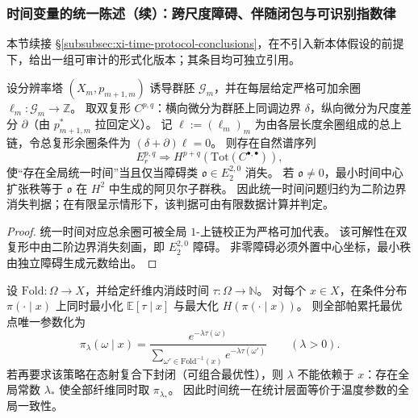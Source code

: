 \subsubsection{时间变量的统一陈述（续）：跨尺度障碍、伴随闭包与可识别指数律}\label{subsubsec:xi-time-protocol-conclusions-part2}
本节续接 \S\ref{subsubsec:xi-time-protocol-conclusions}，在不引入新本体假设的前提下，给出一组可审计的形式化版本；其条目均可独立引用。

\begin{theorem}\label{thm:xi-scale-time-bicomplex-obstruction}
设分辨率塔 \((X_m,p_{m+1,m})\) 诱导群胚 \(\mathcal G_m\)，并在每层给定严格可加余圈 \(\ell_m:\mathcal G_m\to\mathbb Z\)。
取双复形 \(C^{p,q}\)：横向微分为群胚上同调边界 \(\delta\)，纵向微分为尺度差分 \(\partial\)（由 \(p_{m+1,m}^\ast\) 拉回定义）。
记 \(\ell:=(\ell_m)_m\) 为由各层长度余圈组成的总上链，令总复形余圈条件为 \((\delta+\partial)\ell=0\)。
则存在自然谱序列
\[
E_r^{p,q}\Rightarrow H^{p+q}(\mathrm{Tot}(C^{\bullet,\bullet})),
\]
使“存在全局统一时间”当且仅当障碍类 \(\mathfrak o\in E_2^{2,0}\) 消失。
若 \(\mathfrak o\neq 0\)，最小时间中心扩张秩等于 \(\mathfrak o\) 在 \(H^2\) 中生成的阿贝尔子群秩。
因此统一时间问题归约为二阶边界消失判据；在有限呈示情形下，该判据可由有限数据计算并判定。
\end{theorem}

\begin{proof}
统一时间对应总余圈可被全局 \(1\)-上链校正为严格可加代表。
该可解性在双复形中由二阶边界消失刻画，即 \(E_2^{2,0}\) 障碍。
非零障碍必须外置中心坐标，最小秩由独立障碍生成元数给出。
\end{proof}

\begin{theorem}\label{thm:xi-time-entropy-pareto-gibbs-global-temperature}
设 \(\mathrm{Fold}:\Omega\to X\)，并给定纤维内消歧时间 \(\tau:\Omega\to\mathbb N\)。
对每个 \(x\in X\)，在条件分布 \(\pi(\cdot\mid x)\) 上同时最小化 \(\mathbb E[\tau\mid x]\) 与最大化 \(H(\pi(\cdot\mid x))\)。
则全部帕累托最优点唯一参数化为
\[
\pi_\lambda(\omega\mid x)
=
\frac{e^{-\lambda\tau(\omega)}}{\sum_{\omega'\in \mathrm{Fold}^{-1}(x)}e^{-\lambda\tau(\omega')}}\qquad(\lambda>0).
\]
若再要求该策略在态射复合下封闭（可组合最优性），则 \(\lambda\) 不能依赖于 \(x\)：存在全局常数 \(\lambda_\ast\) 使全部纤维同时取 \(\pi_{\lambda_\ast}\)。
因此时间统一在统计层面等价于温度参数的全局一致性。
\end{theorem}

